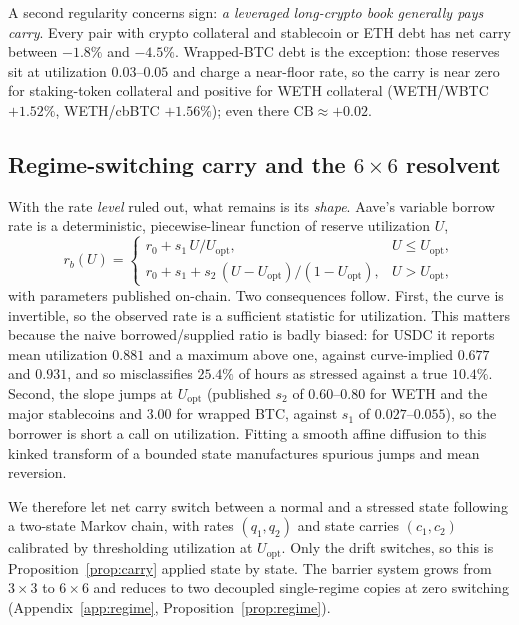 \documentclass[11pt]{article}
\theoremstyle{plain}
\theoremstyle{definition}
\theoremstyle{remark}
\begin{document}
A second regularity concerns sign: \emph{a leveraged long-crypto book generally pays carry}. Every
pair with crypto collateral and stablecoin or ETH debt has net carry between $-1.8\%$ and $-4.5\%$.
Wrapped-BTC debt is the exception: those reserves sit at utilization $0.03$--$0.05$ and charge a
near-floor rate, so the carry is near zero for staking-token collateral and positive for WETH
collateral (WETH/WBTC $+1.52\%$, WETH/cbBTC $+1.56\%$); even there $\mathrm{CB}\approx+0.02$.

\subsection{Regime-switching carry and the \texorpdfstring{$6\times6$}{6x6} resolvent}\label{sec:carry-regime}

With the rate \emph{level} ruled out, what remains is its \emph{shape}. Aave's variable borrow rate
is a deterministic, piecewise-linear function of reserve utilization $U$,
\begin{equation}\label{eq:rate-curve}
r_b(U)=
\begin{cases}
r_0+s_1\,U/U_{\mathrm{opt}}, & U\le U_{\mathrm{opt}},\\[2pt]
r_0+s_1+s_2\,(U-U_{\mathrm{opt}})/(1-U_{\mathrm{opt}}), & U> U_{\mathrm{opt}},
\end{cases}
\end{equation}
with parameters published on-chain. Two consequences follow. First, the curve is invertible, so the
observed rate is a sufficient statistic for utilization. This matters because the naive
borrowed/supplied ratio is badly biased: for USDC it reports mean utilization $0.881$ and a maximum
above one, against curve-implied $0.677$ and $0.931$, and so misclassifies $25.4\%$ of hours as
stressed against a true $10.4\%$. Second, the slope jumps at $U_{\mathrm{opt}}$ (published $s_2$ of
$0.60$--$0.80$ for WETH and the major stablecoins and $3.00$ for wrapped BTC, against $s_1$ of
$0.027$--$0.055$), so the borrower is short a call on utilization. Fitting a smooth affine diffusion
to this kinked transform of a bounded state manufactures spurious jumps and mean reversion.

We therefore let net carry switch between a normal and a stressed state following a two-state Markov
chain, with rates $(q_1,q_2)$ and state carries $(c_1,c_2)$ calibrated by thresholding utilization at
$U_{\mathrm{opt}}$. Only the drift switches, so this is Proposition~\ref{prop:carry} applied state by
state. The barrier system grows from $3\times3$ to $6\times6$ and reduces to two decoupled
single-regime copies at zero switching (Appendix~\ref{app:regime}, Proposition~\ref{prop:regime}).
\end{document}
